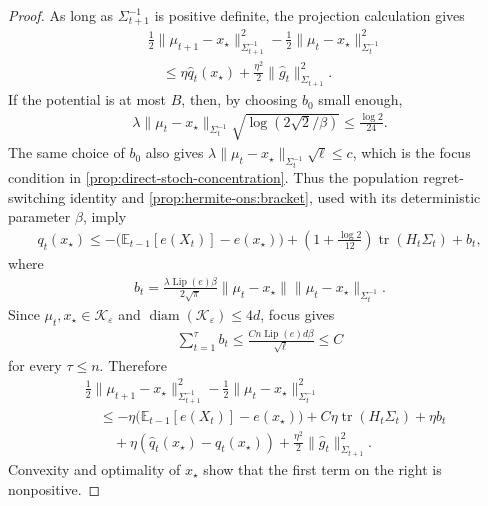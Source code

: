 \documentclass{article}
\theoremstyle{plain}
\theoremstyle{definition}
\theoremstyle{plain}
\newcommand{\tr}{\operatorname{tr}}
\newcommand{\E}{\mathbb E}
\newcommand{\cK}{\mathcal K}
\begin{document}
\begin{proof}
    As long as $\Sigma_{t+1}^{-1}$ is positive definite, the projection
    calculation gives
    \begin{align}
         & \frac12\|\mu_{t+1}-x_\star\|_{\Sigma_{t+1}^{-1}}^2
        -\frac12\|\mu_t-x_\star\|_{\Sigma_t^{-1}}^2
        \nonumber                                             \\
         & \quad\leq
        \eta\widehat q_t(x_\star)
        +\frac{\eta^2}{2}
        \|\widehat g_t\|_{\Sigma_{t+1}}^2.
        \label{eq:direct-stoch-noisy-projection}
    \end{align}
    If the potential is at most $B$, then, by choosing $b_0$ small
    enough,
    \begin{align}
        \lambda\|\mu_t-x_\star\|_{\Sigma_t^{-1}}
        \sqrt{\log(2\sqrt2/\beta)}
        \leq\frac{\log2}{24}.
    \end{align}
    The same choice of $b_0$ also gives
    $\lambda\|\mu_t-x_\star\|_{\Sigma_t^{-1}}\sqrt\ell\leq c$, which
    is the focus condition in
    \cref{prop:direct-stoch-concentration}.
    Thus the population regret-switching identity and
    \cref{prop:hermite-ons:bracket}, used with its deterministic
    parameter $\beta$, imply
    \begin{align}
        q_t(x_\star)
        \leq
        -\bigl(\E_{t-1}[e(X_t)]-e(x_\star)\bigr)
        +\left(1+\frac{\log2}{12}\right)
        \tr(H_t\Sigma_t)
        +b_t,
        \label{eq:direct-stoch-population-one-step}
    \end{align}
    where
    \begin{align}
        b_t=
        \frac{\lambda\operatorname{Lip}(e)\beta}{2\sqrt\pi}
        \|\mu_t-x_\star\|
        \|\mu_t-x_\star\|_{\Sigma_t^{-1}}.
        \label{eq:direct-stoch-bracket-error}
    \end{align}
    Since $\mu_t,x_\star\in\cK_\varepsilon$ and
    $\operatorname{diam}(\cK_\varepsilon)\leq4d$, focus gives
    \begin{align}
        \sum_{t=1}^{\tau}b_t
        \leq
        \frac{C n\operatorname{Lip}(e)d\beta}{\sqrt\ell}
        \leq C
        \label{eq:direct-stoch-total-bracket-error}
    \end{align}
    for every $\tau\leq n$.
    Therefore
    \begin{align}
         & \frac12\|\mu_{t+1}-x_\star\|_{\Sigma_{t+1}^{-1}}^2
        -\frac12\|\mu_t-x_\star\|_{\Sigma_t^{-1}}^2
        \nonumber                                             \\
         & \quad\leq
        -\eta\bigl(\E_{t-1}[e(X_t)]-e(x_\star)\bigr)
        +C\eta\tr(H_t\Sigma_t)
        +\eta b_t
        \nonumber                                             \\
         & \qquad+
        \eta(\widehat q_t(x_\star)-q_t(x_\star))
        +\frac{\eta^2}{2}
        \|\widehat g_t\|_{\Sigma_{t+1}}^2.
        \label{eq:direct-stoch-noisy-recursion}
    \end{align}
    Convexity and optimality of $x_\star$ show that the first term on
    the right is nonpositive.


\end{proof}
\end{document}
